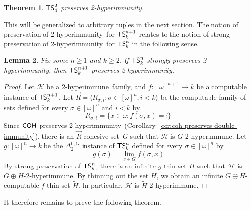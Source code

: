 \documentclass{amsart}
\newtheorem{theorem}{Theorem}[section]
\newtheorem{lemma}[theorem]{Lemma}
\theoremstyle{definition}
\theoremstyle{remark}
\numberwithin{equation}{section}
\theoremstyle{noparens}
\def\propertyL{2-hyperimmunity}
\def\hyper{2-hyperimmune}
\newcommand{\Hcal}{\mathcal{H}}
\newcommand{\s}[1]{\ensuremath{\sf{#1}}}
\DeclareMathOperator{\coh}{\s{COH}}
\DeclareMathOperator{\ts}{\s{TS}}
\begin{document}
\begin{theorem}\label{thm:ts24-preserves-double-immunity}
$\ts^2_4$ preserves \propertyL.
\end{theorem}

This will be generalized to arbitrary tuples in the next section.
The notion of preservation of \propertyL\ for $\ts^{n+1}_k$ relates
to the notion of strong preservation of \propertyL\ for $\ts^n_k$ in the following sense.

\begin{lemma}\label{lem:ts-n-to-np1-strongly-double-immune}
Fix some $n \geq 1$ and $k \geq 2$.
If $\ts^n_k$ strongly preserves \propertyL,
then $\ts^{n+1}_k$ preserves \propertyL.
\end{lemma}
\begin{proof}
Let $\Hcal$ be a  \hyper\ family, and $f : [\omega]^{n+1} \to k$ be a  computable
instance of $\ts^{n+1}_k$. Let $\vec{R} = \langle R_{\sigma,i} : \sigma \in [\omega]^n, i < k \rangle$
be the  computable family of sets defined for every $\sigma \in [\omega]^n$ and $i < k$ by
$$
R_{\sigma,i} = \{ x \in \omega : f(\sigma,x) = i \}
$$
Since $\coh$ preserves \propertyL\ (Corollary~\ref{cor:coh-preserves-double-immunity}), there
is an $\vec{R}$-cohesive set~$G$ such that $\Hcal$ is $G$-\hyper.
Let $g : [\omega]^n \to k$ be the $\Delta^{0,G}_2$ instance of $\ts^n_k$ defined for every $\sigma \in [\omega]^n$ by
$$
g(\sigma) = \lim_{x \in G} f(\sigma, x)
$$
By strong preservation of $\ts^n_k$, there is an infinite $g$-thin set $H$
such that $\Hcal$ is $  G \oplus H$-\hyper.
By thinning out the set $H$, we obtain an infinite $ G \oplus H$-computable $f$-thin set $\tilde{H}$.
In particular, $\Hcal$ is $ \tilde{H}$-\hyper.
\end{proof}

It therefore remains to prove the following theorem.
\end{document}
